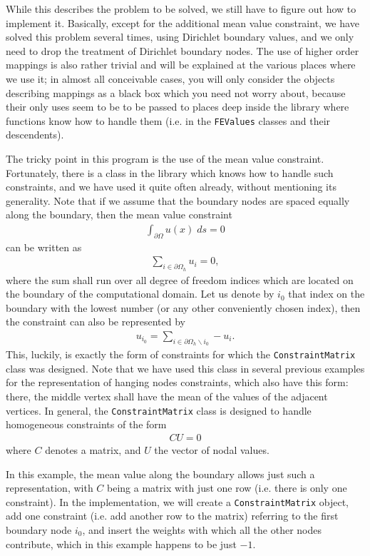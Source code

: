 \documentclass{article}
\begin{document}
While this describes the problem to be solved, we still have to figure out how
to implement it. Basically, except for the additional mean value constraint,
we have solved this problem several times, using Dirichlet boundary values,
and we only need to drop the treatment of Dirichlet boundary nodes. The use of
higher order mappings is also rather trivial and will be explained at the
various places where we use it; in almost all conceivable cases, you will only
consider the objects describing mappings as a black box which you need not
worry about, because their only uses seem to be to be passed to places deep
inside the library where functions know how to handle them (i.e. in the
\texttt{FEValues} classes and their descendents).

The tricky point in this program is the use of the mean value
constraint. Fortunately, there is a class in the library which knows how to
handle such constraints, and we have used it quite often already, without
mentioning its generality. Note that if we assume that the boundary nodes are
spaced equally along the boundary, then the mean value constraint
\begin{gather*}
  \int_{\partial \Omega} u(x) \; ds = 0
\end{gather*}
can be written as
\begin{gather*}
  \sum_{i\in\partial\Omega_h} u_i = 0,
\end{gather*}
where the sum shall run over all degree of freedom indices which are located
on the boundary of the computational domain. Let us denote by $i_0$ that index
on the boundary with the lowest number (or any other conveniently chosen
index), then the constraint can also be represented by
\begin{gather*}
  u_{i_0} = \sum_{i\in\partial\Omega_h\backslash i_0} -u_i.
\end{gather*}
This, luckily, is exactly the form of constraints for which the
\texttt{ConstraintMatrix} class was designed. Note that we have used this
class in several previous examples for the representation of hanging nodes
constraints, which also have this form: there, the middle vertex shall have
the mean of the values of the adjacent vertices. In general, the
\texttt{ConstraintMatrix} class is designed to handle homogeneous constraints
of the form
\begin{gather*}
  CU = 0
\end{gather*}
where $C$ denotes a matrix, and $U$ the vector of nodal values.

In this example, the mean value along the boundary allows just such a
representation, with $C$ being a matrix with just one row (i.e. there is only
one constraint). In the implementation, we will create a
\texttt{ConstraintMatrix} object, add one constraint (i.e. add another row to
the matrix) referring to the first boundary node $i_0$, and insert the weights
with which all the other nodes contribute, which in this example happens to be
just $-1$.
\end{document}
